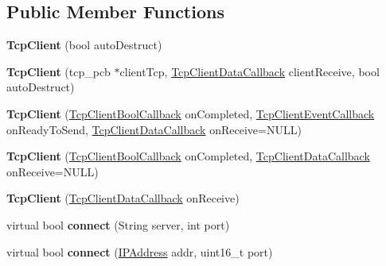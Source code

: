 \subsection*{Public Member Functions}
\begin{DoxyCompactItemize}
\item 
\hypertarget{class_tcp_client_a4d2ba17936e3447c4e19984c1452f58c}{}{\bfseries Tcp\+Client} (bool auto\+Destruct)\label{class_tcp_client_a4d2ba17936e3447c4e19984c1452f58c}

\item 
\hypertarget{class_tcp_client_a497b51d3af4d908bd5f8fc834406d958}{}{\bfseries Tcp\+Client} (tcp\+\_\+pcb $\ast$client\+Tcp, \hyperlink{class_delegate}{Tcp\+Client\+Data\+Callback} client\+Receive, bool auto\+Destruct)\label{class_tcp_client_a497b51d3af4d908bd5f8fc834406d958}

\item 
\hypertarget{class_tcp_client_a917bbc3e31bbe21d8559c10239c57e93}{}{\bfseries Tcp\+Client} (\hyperlink{class_delegate}{Tcp\+Client\+Bool\+Callback} on\+Completed, \hyperlink{class_delegate}{Tcp\+Client\+Event\+Callback} on\+Ready\+To\+Send, \hyperlink{class_delegate}{Tcp\+Client\+Data\+Callback} on\+Receive=N\+U\+L\+L)\label{class_tcp_client_a917bbc3e31bbe21d8559c10239c57e93}

\item 
\hypertarget{class_tcp_client_a07f2ee5c3af559cdcc907c2966f23d2b}{}{\bfseries Tcp\+Client} (\hyperlink{class_delegate}{Tcp\+Client\+Bool\+Callback} on\+Completed, \hyperlink{class_delegate}{Tcp\+Client\+Data\+Callback} on\+Receive=N\+U\+L\+L)\label{class_tcp_client_a07f2ee5c3af559cdcc907c2966f23d2b}

\item 
\hypertarget{class_tcp_client_aac792f1ec97d83a5d585b3d8d2c37d9a}{}{\bfseries Tcp\+Client} (\hyperlink{class_delegate}{Tcp\+Client\+Data\+Callback} on\+Receive)\label{class_tcp_client_aac792f1ec97d83a5d585b3d8d2c37d9a}

\item 
\hypertarget{class_tcp_client_afd0490a4bf9a16b3609828d61b51b36f}{}virtual bool {\bfseries connect} (String server, int port)\label{class_tcp_client_afd0490a4bf9a16b3609828d61b51b36f}

\item 
\hypertarget{class_tcp_client_a50f33d7a069d02a419c1280f665b89ad}{}virtual bool {\bfseries connect} (\hyperlink{class_i_p_address}{I\+P\+Address} addr, uint16\+\_\+t port)\label{class_tcp_client_a50f33d7a069d02a419c1280f665b89ad}


\end{DoxyCompactItemize}
